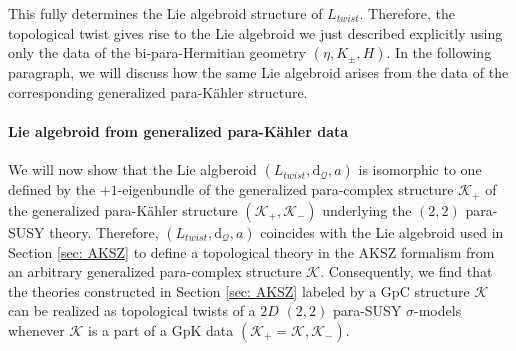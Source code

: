 \documentclass{article}
\newcommand{\KK}{\mathcal{K}}
\newcommand{\QQ}{\mathcal{Q}}
\newcommand{\rd}{\mathrm{d}}
\newcommand{\Lb}{\mathbb{L}}
\theoremstyle{definition}
\theoremstyle{remark}
\def\brian{\textcolor{blue}{BM: }\textcolor{blue}}
\def\btd{\textcolor{orange}{BM to DB: }\textcolor{orange}}
\begin{document}
This fully determines the Lie algebroid structure of $L_{twist}$. Therefore, the topological twist gives rise to the Lie algebroid we just described explicitly using only the data of the bi-para-Hermitian geometry $(\eta,K_\pm,H)$. In the following paragraph, we will discuss how the same Lie algebroid arises from the data of the corresponding generalized para-K\"ahler structure.

\paragraph{Lie algebroid from generalized para-K\"ahler data}
%
We will now show that the Lie algberoid $(L_{twist},\rd_\QQ,a)$ is isomorphic to one defined by the $+1$-eigenbundle of the generalized para-complex structure $\KK_+$ of the generalized para-K\"ahler structure $(\KK_+,\KK_-)$ underlying the $(2,2)$ para-SUSY theory. Therefore, $(L_{twist},\rd_\QQ,a)$ coincides with the Lie algebroid used in Section \ref{sec: AKSZ} to define a topological theory in the AKSZ formalism from an arbitrary generalized para-complex structure $\KK$. Consequently, we find that the theories constructed in Section \ref{sec: AKSZ} labeled by a GpC structure $\KK$ can be realized as topological twists of a $2D$ $(2,2)$ para-SUSY $\sigma$-models whenever $\KK$ is a part of a GpK data $(\KK_+=\KK,\KK_-)$.
\end{document}
